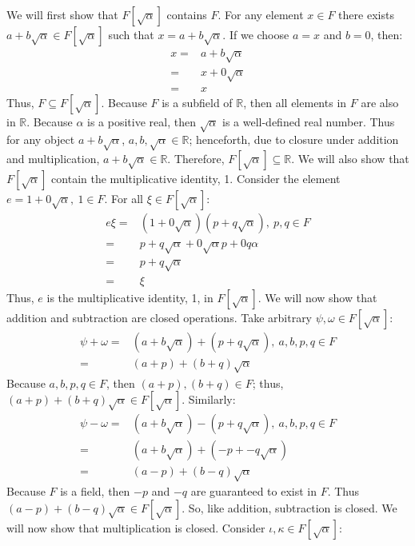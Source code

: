 \documentclass[11pt]{article}
\begin{document}
\begin{flushleft}
We will first show that $F[\sqrt{\alpha}]$ contains $F$. For any element $x \in F$ there exists $a + b \sqrt{\alpha} \in F[\sqrt{\alpha}]$ such that $x = a + b \sqrt{\alpha}$. If we choose $a = x$ and $b = 0$, then:
\begin{align*}
x = & a + b \sqrt{\alpha} \\
= & x + 0 \sqrt{\alpha} \\
= & x
\end{align*}
Thus, $F \subseteq F[\sqrt{\alpha}]$. Because $F$ is a subfield of $\mathbb{R}$, then all elements in $F$ are also in $\mathbb{R}$. Because $\alpha$ is a positive real, then $\sqrt{\alpha}$ is a well-defined real number. Thus for any object $a + b\sqrt{\alpha}$, $a,b,\sqrt{\alpha} \in \mathbb{R}$; henceforth, due to closure under addition and multiplication, $a + b \sqrt{\alpha} \in \mathbb{R}$. Therefore, $F[\sqrt{\alpha}] \subseteq \mathbb{R}$. We will also show that $F[\sqrt{\alpha}]$ contain the multiplicative identity, 1. Consider the element $e = 1 + 0 \sqrt{\alpha}, \ 1 \in F$. For all $\xi \in F[\sqrt{\alpha}]$:
\begin{align*}
e \xi = & (1 + 0 \sqrt{\alpha})(p + q \sqrt{\alpha}), \ p,q \in F \\
= & p + q \sqrt{\alpha} + 0 \sqrt{\alpha} p + 0 q \alpha \\
= & p + q \sqrt{\alpha} \\
= & \xi
\end{align*}
Thus, $e$ is the multiplicative identity, 1, in $F[\sqrt{\alpha}]$. We will now show that addition and subtraction are closed operations. Take arbitrary $ \psi , \omega \in F[\sqrt{\alpha}]$:
\begin{align*}
\psi + \omega = & (a + b \sqrt{\alpha}) + (p + q \sqrt{\alpha}), \ a,b,p,q \in F \\
= & (a + p) + (b + q)\sqrt{\alpha} 
\end{align*}
Because $a,b,p,q \in F$, then $(a + p),(b + q) \in F$; thus, $(a + p) + (b + q)\sqrt{\alpha} \in F[\sqrt{\alpha}]$. Similarly:
\begin{align*}
\psi - \omega = & (a + b \sqrt{\alpha}) - (p + q \sqrt{\alpha}), \ a,b,p,q \in F \\
= & (a + b \sqrt{\alpha}) + (-p + -q \sqrt{\alpha}) \\
= & (a -p) + (b -q) \sqrt{\alpha}
\end{align*}
Because $F$ is a field, then $-p$ and $-q$ are guaranteed to exist in $F$. Thus $(a -p) + (b -q) \sqrt{\alpha} \in F[\sqrt{\alpha}]$. So, like addition, subtraction is closed. We will now show that multiplication is closed. Consider $ \iota , \kappa \in F[\sqrt{\alpha}]$:

\end{flushleft}
\end{document}
